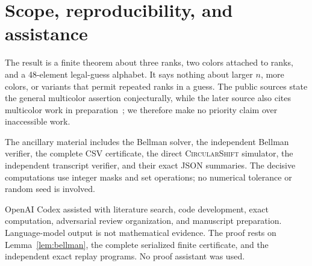 \documentclass[11pt]{article}
\begin{document}
\section{Scope, reproducibility, and assistance}

The result is a finite theorem about three ranks, two colors attached to ranks,
and a 48-element legal-guess alphabet.  It says nothing about larger $n$, more
colors, or variants that permit repeated ranks in a guess.  The public sources
state the general multicolor assertion conjecturally, while the later source
also cites multicolor work in preparation~\cite{KutinSmithlineVatter2026}; we
therefore make no priority claim over inaccessible work.

The ancillary material includes the Bellman solver, the independent Bellman
verifier, the complete CSV certificate, the direct \textsc{CircularShift}
simulator, the independent transcript verifier, and their exact JSON summaries.
The decisive computations use integer masks and set operations; no numerical
tolerance or random seed is involved.

OpenAI Codex assisted with literature search, code development, exact
computation, adversarial review organization, and manuscript preparation.
Language-model output is not mathematical evidence.  The proof rests on
Lemma~\ref{lem:bellman}, the complete serialized finite certificate, and the
independent exact replay programs.  No proof assistant was used.



\end{document}
